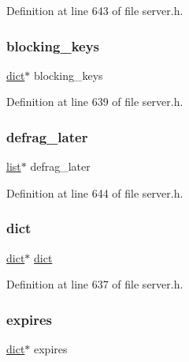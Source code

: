 Definition at line 643 of file server.\+h.

\mbox{\label{structredis_db_a439ca8f8cd0c2a19b8d2e0fe0044160d}} 
\subsubsection{\texorpdfstring{blocking\+\_\+keys}{blocking\_keys}}
{\footnotesize\ttfamily \hyperlink{structdict}{dict}$\ast$ blocking\+\_\+keys}



Definition at line 639 of file server.\+h.

\mbox{\label{structredis_db_ae22579f2281ceefa3099ad028f0c6260}} 
\subsubsection{\texorpdfstring{defrag\+\_\+later}{defrag\_later}}
{\footnotesize\ttfamily \hyperlink{structlist}{list}$\ast$ defrag\+\_\+later}



Definition at line 644 of file server.\+h.

\mbox{\label{structredis_db_aad961c2f260766ff3627bf363fef3551}} 
\subsubsection{\texorpdfstring{dict}{dict}}
{\footnotesize\ttfamily \hyperlink{structdict}{dict}$\ast$ \hyperlink{structdict}{dict}}



Definition at line 637 of file server.\+h.

\mbox{\label{structredis_db_af8dcf36ca4b084db164becc8e1c71b67}} 
\subsubsection{\texorpdfstring{expires}{expires}}
{\footnotesize\ttfamily \hyperlink{structdict}{dict}$\ast$ expires}



